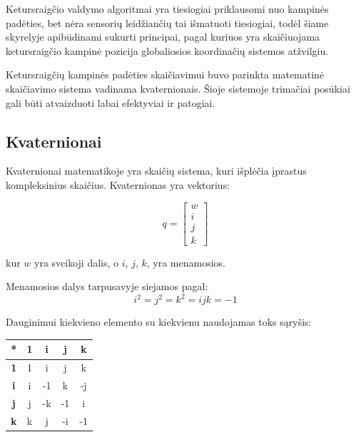 \documentclass[12pt, a4paper, lithuanian, final]{article}
\begin{document}
Ketursraigčio valdymo algoritmai yra tiesiogiai priklausomi nuo kampinės padėties, bet nėra sensorių leidžiančių tai išmatuoti tiesiogiai, todėl šiame skyrelyje apibūdinami sukurti principai, pagal kuriuos yra skaičiuojama ketursraigčio kampinė pozicija globaliosios koordinačių sistemos atžvilgiu.

Ketursraigčių kampinės padėties skaičiavimui buvo parinkta matematinė skaičiavimo sistema vadinama kvaternionais.
Šioje sistemoje trimačiai posūkiai gali būti atvaizduoti labai efektyviai ir patogiai.

\subsection{Kvaternionai}
\label{subskyr-quaternion}

Kvaternionai matematikoje yra skaičių sistema, kuri išplėčia įprastus kompleksinius skaičius.
Kvaternionas yra vektorius:

\begin{equation}
	q = \left[
		\begin{array}{c}
			w \\
			i \\
			j \\
			k
		\end{array}
	\right]
\end{equation}

kur $w$ yra sveikoji dalis, o $i$, $j$, $k$, yra menamosios.


Menamosios dalys tarpusavyje siejamos pagal:
\begin{equation}
	i^2 = j^2 = k^2 = ijk = -1
\end{equation}

Dauginimui kiekvieno elemento su kiekvienu naudojamas toks sąryšis:

\begin{center}
\begin{tabular}{ | c | c | c | c | c | }
	\hline
	\textbf{*} & \textbf{1} & \textbf{i} & \textbf{j} & \textbf{k} \\
	\hline
	\textbf{1} & 1 & i & j & k \\
	\hline
	\textbf{i} & i & -1 & k & -j \\
	\hline
	\textbf{j} & j & -k & -1 & i \\
	\hline
	\textbf{k} & k & j & -i & -1 \\
	\hline
\end{tabular}
\end{center}
\end{document}
